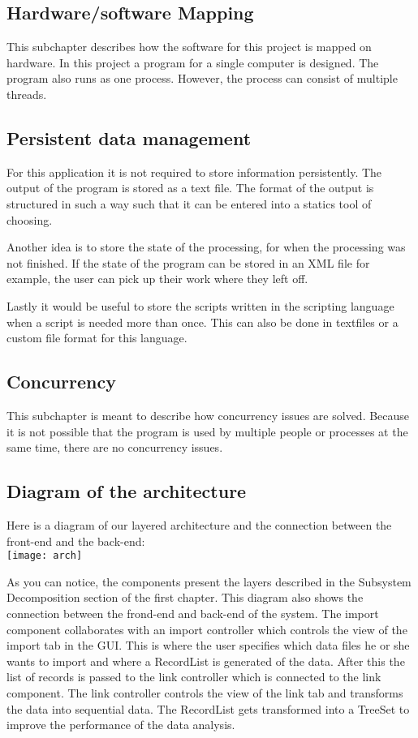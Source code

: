 \documentclass[a4paper,english,fleqn]{exam}
\begin{document}
\subsection{Hardware/software Mapping}
This subchapter describes how the software for this project is mapped on hardware. In this project a program for a single computer is designed. The program also runs as one process. However, the process can consist of multiple threads. 

\subsection{Persistent data management}
For this application it is not required to store information persistently. The output of the program is stored as a text file. The format of the output is structured in such a way such that it can be entered into a statics tool of choosing.

Another idea is to store the state of the processing, for when the processing was not finished. If the state of the program can be stored in an XML file for example, the user can pick up their work where they left off. 

Lastly it would be useful to store the scripts written in the scripting language when a script is needed more than once. This can also be done in textfiles or a custom file format for this language. 

\subsection{Concurrency}
This subchapter is meant to describe how concurrency issues are solved. Because it is not possible that the program is used by multiple people or processes at the same time, there are no concurrency issues.  
\newpage

\subsection{Diagram of the architecture}

Here is a diagram of our layered architecture and the connection between the front-end and the back-end: \\

\texttt{[image: arch]}

As you can notice, the components present the layers described in the Subsystem Decomposition section of the first chapter. This diagram also shows the connection between the frond-end and back-end of the system. The import component collaborates with an import controller which controls the view of the import tab in the GUI. This is where the user specifies which data files he or she wants to import and where a RecordList is generated of the data. After this the list of records is passed to the link controller which is connected to the link component. The link controller controls the view of the link tab and transforms the data into sequential data. The RecordList gets transformed into a TreeSet to improve the performance of the data analysis. 
\end{document}
